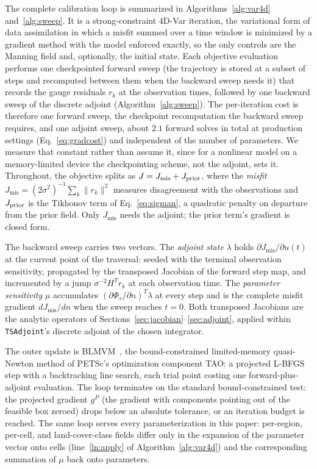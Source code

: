 \documentclass[11pt]{article}
\begin{document}
The complete calibration loop is summarized in
Algorithms~\ref{alg:var4d} and~\ref{alg:sweep}. It is a strong-constraint
4D-Var iteration, the variational form of data assimilation in which a
misfit summed over a time window is minimized by a gradient method
with the model enforced exactly, so the only controls are the Manning
field and, optionally, the initial state. Each objective evaluation
performs one checkpointed forward sweep (the trajectory is stored at
a subset of steps and recomputed between them when the backward sweep
needs it) that records the gauge residuals $r_k$ at the observation
times, followed by one backward sweep of the discrete adjoint
(Algorithm~\ref{alg:sweep}).
The per-iteration cost is therefore one forward sweep, the checkpoint
recomputation the backward sweep requires, and one adjoint sweep,
about $2.1$ forward solves in total at production settings
(Eq.~\eqref{eq:gradcost}) and independent of the number of parameters.
We measure that constant rather than assume it, since for a nonlinear
model on a memory-limited device the checkpointing scheme, not the
adjoint, sets it. Throughout, the
objective splits as $J = J_{\mathrm{mis}} + J_{\rm prior}$, where the
\emph{misfit} $J_{\mathrm{mis}} = (2\sigma^2)^{-1}\sum_k\lVert
r_k\rVert^2$ measures disagreement with the observations and
$J_{\rm prior}$ is the Tikhonov term of Eq.~\eqref{eq:sigman}, a
quadratic penalty on departure from the prior field. Only
$J_{\mathrm{mis}}$ needs the adjoint; the prior term's gradient is
closed form.

The backward sweep carries two vectors. The \emph{adjoint state}
$\lambda$ holds $\partial J_{\mathrm{mis}}/\partial u(t)$ at the
current point of the traversal: seeded with the terminal observation
sensitivity, propagated by the transposed Jacobian of the forward
step map, and incremented by a jump $\sigma^{-2}H^T r_k$ at each
observation time. The \emph{parameter sensitivity} $\mu$ accumulates
$(\partial\Phi_s/\partial n)^T\lambda$ at every step and is the
complete misfit gradient $dJ_{\mathrm{mis}}/dn$ when the sweep
reaches $t = 0$. Both transposed Jacobians are the analytic operators
of Sections~\ref{sec:jacobian}--\ref{sec:adjoint}, applied within
\texttt{TSAdjoint}'s discrete adjoint of the chosen integrator.

The outer update is BLMVM~\cite{benson2001blmvm}, the bound-constrained
limited-memory quasi-Newton method of PETSc's optimization component
TAO: a projected L-BFGS
step with a backtracking line search, each trial point costing one
forward-plus-adjoint evaluation. The loop terminates on the standard
bound-constrained test: the projected gradient $g^P$ (the gradient
with components pointing out of the feasible box zeroed) drops below
an absolute tolerance, or an iteration budget is reached. The same
loop serves every parameterization in this paper: per-region,
per-cell, and land-cover-class fields differ only in the expansion of
the parameter vector onto cells (line~\ref{ln:apply} of
Algorithm~\ref{alg:var4d}) and the corresponding summation of $\mu$
back onto parameters.
\end{document}
